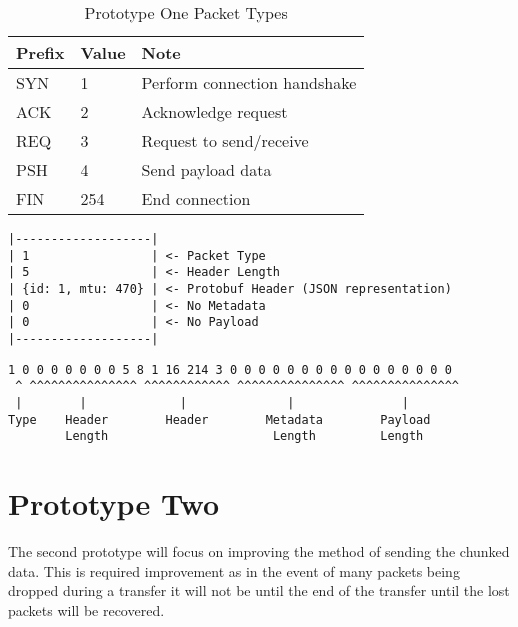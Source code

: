 \begin{table}[ht]
	\caption{Prototype One Packet Types}
	\label{tab:p1d-packet-types}
	\centering
	\begin{tabular}{ l l l }
		\hline
		\textbf{Prefix} & \textbf{Value} & \textbf{Note}                \\
		\hline
		SYN             & 1              & Perform connection handshake \\
		\hline
		ACK             & 2              & Acknowledge request          \\
		\hline
		REQ             & 3              & Request to send/receive      \\
		\hline
		PSH             & 4              & Send payload data            \\
		\hline
		FIN             & 254            & End connection               \\
		\hline
	\end{tabular}
\end{table}

\begin{lstlisting}[float,caption={Prototype One Example Packet Structure},label=lst:p1d-example-structure]
|-------------------|
| 1                 | <- Packet Type
| 5                 | <- Header Length
| {id: 1, mtu: 470} | <- Protobuf Header (JSON representation)
| 0                 | <- No Metadata
| 0                 | <- No Payload
|-------------------|
\end{lstlisting}

\begin{lstlisting}[float,caption={Prototype One Example Packet Binary},label=lst:p1d-example-binary]
 1 0 0 0 0 0 0 0 5 8 1 16 214 3 0 0 0 0 0 0 0 0 0 0 0 0 0 0 0 0
 ^ ^^^^^^^^^^^^^^^ ^^^^^^^^^^^^ ^^^^^^^^^^^^^^^ ^^^^^^^^^^^^^^^
 |        |             |              |               |
Type    Header        Header        Metadata        Payload
        Length                       Length         Length
\end{lstlisting}

\FloatBarrier


\section{Prototype Two}
The second prototype will focus on improving the method of sending the chunked data. This is required improvement as in the event of many packets being dropped during a transfer it will not be until the end of the transfer until the lost packets will be recovered.

